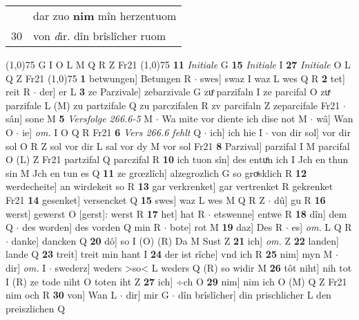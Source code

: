 \documentclass[8pt,a4paper,notitlepage]{article}
\begin{document}
\begin{table}[ht]
\begin{minipage}[t]{0.5\linewidth}
\begin{tabular}{rl}
 & dar zuo \textbf{nim} mîn herzentuom\\ 
30 & von \textit{d}ir. dîn brîslîcher ruom\\ 
\end{tabular}
\scriptsize
\line(1,0){75} \newline
G I O L M Q R Z Fr21 \newline
\line(1,0){75} \newline
\textbf{11} \textit{Initiale} G  \textbf{15} \textit{Initiale} I  \textbf{27} \textit{Initiale} O L Q Z Fr21  \newline
\line(1,0){75} \newline
\textbf{1} betwungen] Betungen R  $\cdot$ swes] swaz I waz L wes Q R \textbf{2} tet] reit R  $\cdot$ der] er L \textbf{3} ze Parzivale] zebarzivale G zuͤ parzifaln I ze parcifal O zuͯ parzifale L (M) zu partzifale Q zu parczifalen R zv parcifaln Z zeparcifale Fr21  $\cdot$ sân] sone M \textbf{5} \textit{Versfolge 266.6-5} M   $\cdot$ Wa mite vor diente ich dise not M  $\cdot$ wâ] Wan O  $\cdot$ ie] \textit{om.} I O Q R Fr21 \textbf{6} \textit{Vers 266.6 fehlt} Q   $\cdot$ ich] ich hie I  $\cdot$ von dir sol] vor dir sol O R Z sol vor dir L sal vor dy M vor sol Fr21 \textbf{8} Parzival] parzifal I M parcifal O (L) Z Fr21 partzifal Q parczifal R \textbf{10} ich tuon sîn] des entuͤn ich I Jch en thun sin M Jch en tun es Q \textbf{11} ze grœzlîch] alzegrozlich G so groͯsklich R \textbf{12} werdecheite] an wirdekeit so R \textbf{13} gar verkrenket] gar vertrenket R gekrenket Fr21 \textbf{14} gesenket] versencket Q \textbf{15} swes] waz L wes M Q R Z  $\cdot$ dû] gu R \textbf{16} werst] gewerst O [gerst]: werst R \textbf{17} het] hat R  $\cdot$ etswenne] entwe R \textbf{18} dîn] dem Q  $\cdot$ des worden] des vorden Q min R  $\cdot$ bote] rot M \textbf{19} daz] Des R  $\cdot$ es] \textit{om.} L Q R  $\cdot$ danke] dancken Q \textbf{20} dô] so I (O) (R) Da M Sust Z \textbf{21} ich] \textit{om.} Z \textbf{22} landen] lande Q \textbf{23} treit] treit min hant I \textbf{24} der ist rîche] vnd ich R \textbf{25} nim] myn M  $\cdot$ dir] \textit{om.} I  $\cdot$ swederz] weders >so< L weders Q (R) so widir M \textbf{26} tôt niht] nih tot I (R) ze tode niht O toten iht Z \textbf{27} ich] ÷ch O \textbf{29} nim] nim ich O (M) Q Z Fr21 nim och R \textbf{30} von] Wan L  $\cdot$ dir] mir G  $\cdot$ dîn brîslîcher] din prischlicher L den preiszlichen Q \newline
\end{minipage}
\hspace{0.5cm}
\begin{minipage}[t]{0.5\linewidth}

\end{minipage}
\end{table}
\end{document}
